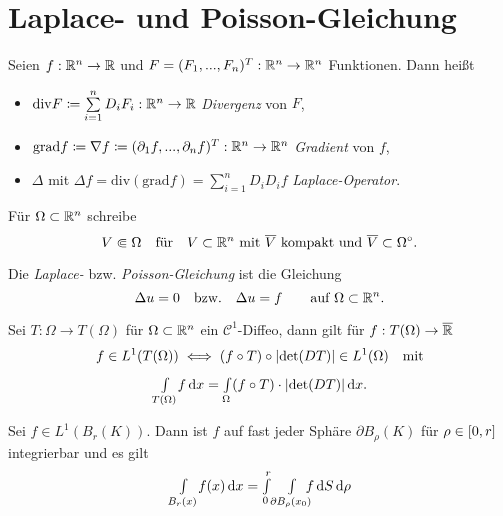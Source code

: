 \documentclass{cheat-sheet}
\newcommand{\grad}{\mathrm{grad}} %
\newcommand{\dive}{\mathrm{div}} %
\begin{document}

\section{Laplace- und Poisson-Gleichung}

\begin{nota}
  Seien $f : \mathbb{R}^n \to \mathbb{R}$ und $F = (F_1, ..., F_n)^T : \mathbb{R}^n \to \mathbb{R}^n$ Funktionen. Dann heißt
  \begin{itemize}
    \item $\dive F \coloneqq \sum_{i=1}^n D_i F_i : \R^n \to \R$ \emph{Divergenz} von $F$,
    \item $\grad f \coloneqq \nabla f \coloneqq (\partial_1 f, ..., \partial_n f)^T : \R^n \to \R^n$ \emph{Gradient} von $f$,
    \item $\Delta$ mit $\Delta f = \dive (\grad f) = \sum_{i=1}^n D_i D_i f$ \emph{Laplace-Operator}.
  \end{itemize}
\end{nota}

\begin{nota}
  Für $\Omega \subset \mathbb{R}^n$ schreibe
  \[
    V \Subset \Omega
    \quad \text{für} \quad
    \text{$V \subset \mathbb{R}^n$ mit $\overline{V}$ kompakt und $\overline{V} \subset \Omega^{\circ} $.}
  \]
\end{nota}

\begin{defn}
  Die \emph{Laplace-} bzw. \emph{Poisson-Gleichung} ist die Gleichung
  \[ \Delta u = 0 \quad \text{bzw.} \quad \Delta u = f \qquad \text{auf $\Omega \subset \mathbb{R}^n$}. \]
\end{defn}


\begin{satz}[Transformationssatz]
  Sei $T : \Omega \to T(\Omega)$ für $\Omega \subset \mathbb{R}^n$ ein $\mathcal{C}^1$-Diffeo, dann gilt für $f : T(\Omega) \to \overline{\mathbb{R}}$
  \[ f \in L^1(T(\Omega)) \iff (f \circ T) \circ \lvert\det(DT)\rvert \in L^1(\Omega) \quad \text{mit} \]
  \[ {\textstyle \int\limits_{T(\Omega)}^{}} f \,\mathrm{d} x = {\textstyle \int\limits_{\Omega}^{}} (f \circ T) \cdot \lvert\det(DT)\rvert \,\mathrm{d} x. \]
\end{satz}

\begin{bsp}[Polarkoordinaten]
  Sei $f \in L^1(B_r(K))$. Dann ist $f$ auf fast jeder Sphäre $\partial B_\rho(K)$ für $\rho \in \left[ 0, r \right]$ integrierbar und es gilt
  \[ {\textstyle \int\limits_{B_r(x)}^{}} f(x) \,\mathrm{d} x = {\textstyle \int\limits_{0}^{r}} {\textstyle \int\limits_{\partial B_\rho(x_0)}^{}} \!\!\!f \,\mathrm{d} S \,\mathrm{d} \rho \] %
\end{bsp}
\end{document}
